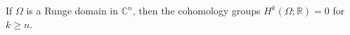 
If $\Omega$ is a Runge domain in $\mathbb{C}^n$, then the cohomology groups $H^k(\Omega; \mathbb{R}) = 0$ for $k \geq n$.
